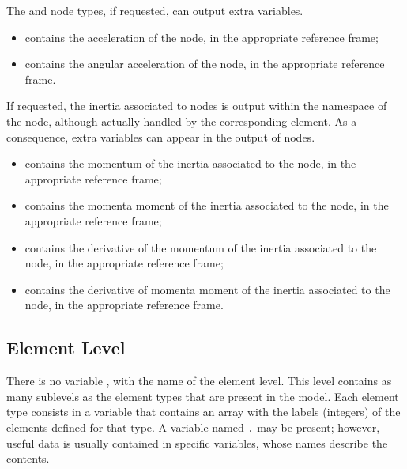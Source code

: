 The  and  node types, if requested, can output
extra variables.
\begin{itemize}
\item {} contains the acceleration of the node,
in the appropriate reference frame;

\item {} contains the angular acceleration
of the node, in the appropriate reference frame.
\end{itemize}

If requested, the inertia associated to  nodes is output
within the namespace of the node, although actually handled
by the corresponding  element.
As a consequence, extra variables can appear in the output
of  nodes.
\begin{itemize}
\item {} contains the momentum of the inertia
associated to the node, in the appropriate reference frame;

\item {} contains the momenta moment of the inertia
associated to the node, in the appropriate reference frame;

\item {} contains the derivative of the momentum
of the inertia associated to the node, in the appropriate reference frame;

\item {} contains the derivative of momenta moment
of the inertia associated to the node, in the appropriate reference frame.
\end{itemize}


\subsection{Element Level}
There is no variable , with the name of the element level.
This level contains as many sublevels as the element types
that are present in the model.
Each element type consists in a variable that contains an array
with the labels (integers) of the elements defined for that type.
A variable named \texttt{.} may be present; however,
useful data is usually contained in specific variables,
whose names describe the contents.

